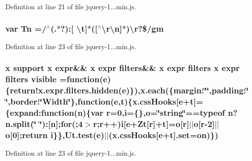 Definition at line 21 of file jquery-\/1...\+min.\+js.

\hypertarget{_scripts_2jquery-1_810_82_8min_8js_a2a743fa90b7bc233019c5b720ccde5cc}{}
\subsubsection[{Tn}]{\setlength{\rightskip}{0pt plus 5cm}var Tn =/$^\wedge$(.$\ast$?)\+:\mbox{[} \textbackslash{}{\bf t}\mbox{]}$\ast$(\mbox{[}$^\wedge$\textbackslash{}r\textbackslash{}n\mbox{]}$\ast$)\textbackslash{}r?\$/gm}\label{_scripts_2jquery-1_810_82_8min_8js_a2a743fa90b7bc233019c5b720ccde5cc}


Definition at line 23 of file jquery-\/1...\+min.\+js.

\hypertarget{_scripts_2jquery-1_810_82_8min_8js_a52992524aa1f4d01d5c9f1b9a15c35f5}{}
\subsubsection[{visible}]{ {\bf x} support {\bf x} expr\&\& {\bf x} expr filters\&\& {\bf x} expr filters {\bf x} expr filters visible =function({\bf e})\{{\bf return!x.\+expr.\+filters.\+hidden}({\bf e})\}),{\bf x.\+each}(\{margin\+:\char`\"{}\char`\"{},padding\+:\char`\"{}\char`\"{},border\+:\char`\"{}Width\char`\"{}\},function({\bf e},{\bf t})\{x.\+css\+Hooks\mbox{[}{\bf e}+{\bf t}\mbox{]}=\{expand\+:function(n)\{var r=0,{\bf i}=\{\},{\bf o}=\char`\"{}string\char`\"{}==typeof n?n.\+split(\char`\"{} \char`\"{})\+:\mbox{[}n\mbox{]};for(;4$>$r;r++){\bf i}\mbox{[}{\bf e}+Zt\mbox{[}r\mbox{]}+{\bf t}\mbox{]}={\bf o}\mbox{[}r\mbox{]}$\vert$$\vert${\bf o}\mbox{[}r-\/2\mbox{]}$\vert$$\vert${\bf o}\mbox{[}0\mbox{]};return {\bf i}\}\},Ut.\+test({\bf e})$\vert$$\vert$(x.\+css\+Hooks\mbox{[}{\bf e}+{\bf t}\mbox{]}.set={\bf on})\})}\label{_scripts_2jquery-1_810_82_8min_8js_a52992524aa1f4d01d5c9f1b9a15c35f5}


Definition at line 23 of file jquery-\/1...\+min.\+js.

\hypertarget{_scripts_2jquery-1_810_82_8min_8js_a4d3ea42bab8c1a36105c29b5a098a050}{}
